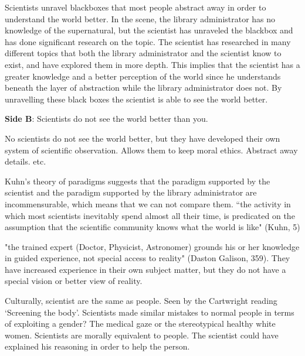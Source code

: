 \documentclass[11pt, oneside]{article}
\begin{document}
\par Scientists unravel blackboxes that most people abstract away in order to understand the world better. In the scene, the library administrator has no knowledge of the supernatural, but the scientist has unraveled the blackbox and has done significant research on the topic. The scientist has researched in many different topics that both the library administrator and the scientist know to exist, and have explored them in more depth. This implies that the scientist has a greater knowledge and a better perception of the world since he understands beneath the layer of abstraction while the library administrator does not. By unravelling these black boxes the scientist is able to see the world better.

\noindent \textbf{Side B}: Scientists do not see the world better than you.


\par No scientists do not see the world better, but they have developed their own system of scientific observation. Allows them to keep moral ethics. Abstract away details. etc.

\par Kuhn's theory of paradigms suggests that the paradigm supported by the scientist and the paradigm supported by the library administrator are incommensurable, which means that we can not compare them. ``the activity in which most scientists inevitably spend almost all their time, is predicated on the assumption that the scientific community knows what the world is like" (Kuhn, 5)

\par "the trained expert (Doctor, Physicist, Astronomer) grounds his or her knowledge in guided experience, not special access to reality" (Daston Galison, 359). They have increased experience in their own subject matter, but they do not have a special vision or better view of reality.

\par Culturally, scientist are the same as people. Seen by the Cartwright reading `Screening the body'. Scientists made similar mistakes to normal people in terms of exploiting a gender? The medical gaze or the stereotypical healthy white women. Scientists are morally equivalent to people. The scientist could have explained his reasoning in order to help the person.
\end{document}
